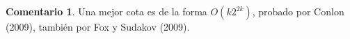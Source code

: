 \documentclass[12pt]{report}
\theoremstyle{plain}
\theoremstyle{definition}
\newtheorem{remark}[theorem]{Comentario}
\begin{document}
\begin{remark}
Una mejor cota es de la forma $O(k 2^{2k})$, probado por Conlon (2009), también por Fox y Sudakov (2009).
\end{remark}
































%





\newpage


{}

\end{document}
